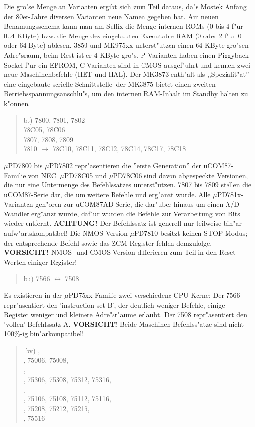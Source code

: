 \documentclass[12pt,a4paper,twoside]{report}
\newcommand{\bb}[1]{{\bf #1}}
\begin{document}
Die gro"se Menge an Varianten ergibt sich zum Teil daraus, da"s
Mostek Anfang der 80er-Jahre diversen Varianten neue Namen gegeben
hat. Am neuen Benamungsschema kann man am Suffix die Menge internen
ROMs (0 bis 4 f"ur 0..4 KByte) bzw. die Menge des eingebauten 
Executable RAM (0 oder 2 f"ur 0 oder 64 Byte) ablesen.  3850 und
MK975xx unterst"utzen einen 64 KByte gro"sen Adre"sraum, beim Rest ist
er 4 KByte gro"s. P-Varianten haben einen Piggyback-Sockel f"ur ein
EPROM, C-Varianten sind in CMOS ausgef"uhrt und kennen zwei
neue Maschinenbefehle (HET und HAL).  Der MK3873 enth"alt als
,,Spezialit"at'' eine eingebaute serielle Schnittstelle, der
MK3875 bietet einen zweiten Betriebsspannungsanschlu"s, um den
internen RAM-Inhalt im Standby halten zu k"onnen.
\begin{quote}
bt) 7800, 7801, 7802 \\
78C05, 78C06 \\
7807, 7808, 7809 \\
7810 $\rightarrow$ 78C10, 78C11, 78C12, 78C14, 78C17, 78C18
\end{quote}
$\mu$PD7800 bis $\mu$PD7802 repr"asentieren die ''erste Generation'' der
uCOM87-Familie von NEC.  $\mu$PD78C05 und $\mu$PD78C06 sind davon abgespeckte
Versionen, die nur eine Untermenge des Befehlssatzes unterst"utzen.  7807
bis 7809 stellen die uCOM87-Serie dar, die um weitere Befehle und erg"anzt
wurde.  Alle $\mu$PD781x-Varianten geh"oren zur uCOM87AD-Serie, die dar"uber
hinaus um einen A/D-Wandler erg"anzt wurde, daf"ur wurden die Befehle zur
Verarbeitung von Bits wieder entfernt.  \bb{ACHTUNG!} Der Befehlssatz ist
generell nur teilweise bin"ar aufw"artskompatibel!  Die NMOS-Version
$\mu$PD7810 besitzt keinen STOP-Modus; der entsprechende Befehl sowie das
ZCM-Register fehlen demzufolge.  \bb{VORSICHT!} NMOS- und CMOS-Version
differieren zum Teil in den Reset-Werten einiger Register!
\begin{quote}
bu) 7566 $\leftrightarrow$ 7508
\end{quote}
Es existieren in der $\mu$PD75xx-Familie zwei verschiedene
CPU-Kerne: Der 7566 repr"asentiert den 'instruction set B', der
deutlich weniger Befehle, einige Register weniger und kleinere
Adre"sr"aume erlaubt.  Der 7508 repr"asentiert den 'vollen'
Befehlssatz A.  {\bf VORSICHT!} Beide Maschinen-Befehlss"atze
sind nicht 100\%-ig bin"arkompatibel!
\begin{quote}
\begin{tabbing}
\hspace{0.7cm} \= \kill
bv) , \\
    , 75006, 75008, \\
    , \\
    , 75306, 75308, 75312, 75316, \\
    , \\
    , 75106, 75108, 75112, 75116, \\
    , 75208, 75212, 75216, \\
    , 75516 \\
\end{tabbing}
\end{quote}
\end{document}
